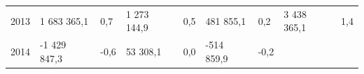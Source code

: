 \begin{longtable}[]{@{}lllllllll@{}}
\begin{minipage}[t]{0.05\columnwidth}\raggedright
2013\strut
\end{minipage} & \begin{minipage}[t]{0.10\columnwidth}\raggedright
1 683 365,1\strut
\end{minipage} & \begin{minipage}[t]{0.06\columnwidth}\raggedright
0,7\strut
\end{minipage} & \begin{minipage}[t]{0.16\columnwidth}\raggedright
1 273 144,9\strut
\end{minipage} & \begin{minipage}[t]{0.06\columnwidth}\raggedright
0,5\strut
\end{minipage} & \begin{minipage}[t]{0.12\columnwidth}\raggedright
481 855,1\strut
\end{minipage} & \begin{minipage}[t]{0.06\columnwidth}\raggedright
0,2\strut
\end{minipage} & \begin{minipage}[t]{0.10\columnwidth}\raggedright
3 438 365,1\strut
\end{minipage} & \begin{minipage}[t]{0.06\columnwidth}\raggedright
1,4\strut
\end{minipage}\tabularnewline
\begin{minipage}[t]{0.05\columnwidth}\raggedright
2014\strut
\end{minipage} & \begin{minipage}[t]{0.10\columnwidth}\raggedright
-1 429 847,3\strut
\end{minipage} & \begin{minipage}[t]{0.06\columnwidth}\raggedright
-0,6\strut
\end{minipage} & \begin{minipage}[t]{0.16\columnwidth}\raggedright
53 308,1\strut
\end{minipage} & \begin{minipage}[t]{0.06\columnwidth}\raggedright
0,0\strut
\end{minipage} & \begin{minipage}[t]{0.12\columnwidth}\raggedright
-514 859,9\strut
\end{minipage} & \begin{minipage}[t]{0.06\columnwidth}\raggedright
-0,2\strut
\end{minipage} & \begin{minipage}[t]{0.10\columnwidth}\raggedright

\end{minipage}
\end{longtable}
